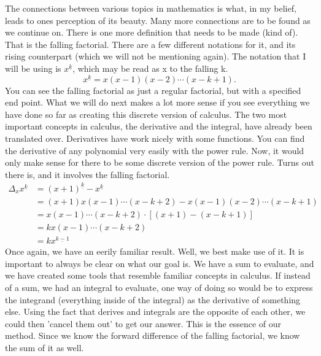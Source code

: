 \documentclass[12pt]{article}
\theoremstyle{definition}
\begin{document}
The connections between various topics in mathematics is what, in my belief, leads to ones perception of its beauty. Many more connections are to be found as we continue on.
There is one more definition that needs to be made (kind of).
That is the falling factorial.
There are a few different notations for it, and its rising counterpart (which we will not be mentioning again).
The notation that I will be using is $x^{\underline{k}}$, which may be read as x to the falling k.
\begin{equation}
    x^{\underline{k}} = x(x-1)(x-2)\cdots(x-k+1).
\end{equation}
You can see the falling factorial as just a regular factorial, but with a specified end point.
What we will do next makes a lot more sense if you see everything we have done so far as creating this discrete version of calculus. The two most important concepts in calculus, the derivative and the integral, have already been translated over.
Derivatives have work nicely with some functions.
You can find the derivative of any polynomial very easily with the power rule.
Now, it would only make sense for there to be some discrete version of the power rule.
Turns out there is, and it involves the falling factorial.
\begin{align*}
    \Delta_x x^{\underline{k}} & = (x+1)^{\underline{k}} - x^{\underline{k}}           \\
                               & = (x+1)x(x-1)\cdots(x-k+2) - x(x-1)(x-2)\cdots(x-k+1) \\
                               & = x(x-1)\cdots(x-k+2) \cdot [(x+1) - (x-k+1)]         \\
                               & = kx(x-1)\cdots(x-k+2)                                \\
                               & = kx^{\underline{k-1}}
\end{align*}
Once again, we have an eerily familiar result.
Well, we best make use of it.
It is important to always be clear on what our goal is.
We have a sum to evaluate, and we have created some tools that resemble familiar concepts in calculus.
If instead of a sum, we had an integral to evaluate, one way of doing so would be to express the integrand (everything inside of the integral) as the derivative of something else.
Using the fact that derives and integrals are the opposite of each other, we could then 'cancel them out' to get our answer.
This is the essence of our method.
Since we know the forward difference of the falling factorial, we know the sum of it as well.
\end{document}
